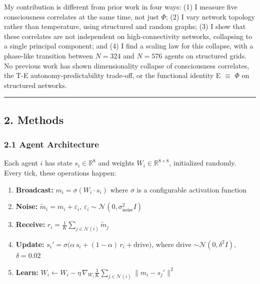 \documentclass[
  11pt,
]{article}
\providecommand{\tightlist}{%
  \setlength{\itemsep}{0pt}\setlength{\parskip}{0pt}}
\begin{document}
My contribution is different from prior work in four ways: (1) I measure
five consciousness correlates at the same time, not just \(\Phi\); (2) I
vary network topology rather than temperature, using structured and
random graphs; (3) I show that these correlates are not independent on
high-connectivity networks, collapsing to a single principal component;
and (4) I find a scaling law for this collapse, with a phase-like
transition between \(N = 324\) and \(N = 576\) agents on structured
grids. No previous work has shown dimensionality collapse of
consciousness correlates, the T-E autonomy-predictability trade-off, or
the functional identity E \(\equiv\) \(\Phi\) on structured networks.

\begin{center}\rule{0.5\linewidth}{0.5pt}\end{center}

\subsection{2. Methods}\label{methods}

\subsubsection{2.1 Agent Architecture}\label{agent-architecture}

Each agent \(i\) has state \(s_i \in \mathbb{R}^8\) and weights
\(W_i \in \mathbb{R}^{8 \times 8}\), initialized randomly. Every tick,
these operations happen:

\begin{enumerate}
\def\labelenumi{\arabic{enumi}.}
\tightlist
\item
  \textbf{Broadcast:} \(m_i = \sigma(W_i \cdot s_i)\) where \(\sigma\)
  is a configurable activation function
\item
  \textbf{Noise:} \(\tilde{m}_i = m_i + \varepsilon_i\),
  \(\varepsilon_i \sim \mathcal{N}(0, \sigma_{\text{noise}}^2 I)\)
\item
  \textbf{Receive:}
  \(r_i = \frac{1}{K} \sum_{j \in \mathcal{N}(i)} \tilde{m}_j\)
\item
  \textbf{Update:}
  \(s_i' = \sigma\!\big(\alpha \, s_i + (1 - \alpha) \, r_i + \text{drive}\big)\),
  where drive \(\sim \mathcal{N}(0, \delta^2 I)\), \(\delta = 0.02\)
\item
  \textbf{Learn:}
  \(W_i \leftarrow W_i - \eta \, \nabla_{W_i} \frac{1}{K}\sum_{j \in \mathcal{N}(i)} \|m_i - s_j'\|^2\)
\end{enumerate}
\end{document}
